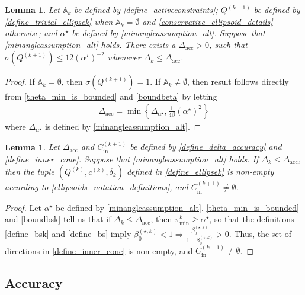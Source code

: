 \documentclass{article}
\newtheorem{lemma}[theorem]{Lemma}
\theoremstyle{case}
\numberwithin{theorem}{subsection}
\newcommand{\activeconstraintsk}{{\mathbb A_{k}}}
\newcommand{\bsk}{{\beta_0^{(\star, k)}}}
\newcommand{\ck}{{c^{(k)}}}
\newcommand{\dacc}{{\Delta_{\textrm{acc}}}}
\newcommand{\dk}{\Delta_k}
\newcommand{\fcki}{{C^{(k+1)}_{\textrm{in}}}}
\newcommand{\minanglealpha}{{ \alpha^{\star} }}
\newcommand{\minangledelta}{{\Delta_{\alpha^{\star}}}}
\newcommand{\qk}{{Q^{(k)}}}
\newcommand{\sdk}{{\delta_k}}
\newcommand{\sk}{{{s}^{(k)}}}
\newcommand{\thetamink}{{\pi^k_{\textrm{min}}}}
\newcommand{\qkpo}{{Q^{(k+1)}}}
\begin{document}
\begin{lemma}
\label{bounded_condition_numbers}
Let $\activeconstraintsk$ be defined by \cref{define_activeconstraints};
$\qkpo$ be defined by \cref{define_trivial_ellipsek} when $\activeconstraintsk = \emptyset$ and \cref{conservative_ellipsoid_details} otherwise;
and $\minanglealpha$ be defined by \cref{minangleassumption_alt}.
Suppose that \cref{minangleassumption_alt} holds.
There exists a $\dacc > 0$, such that $\sigma(\qkpo) \le {12}\left(\minanglealpha\right)^{-2}$ whenever $\dk \le \dacc$.
\end{lemma}
\begin{proof}
If $\activeconstraintsk = \emptyset$, then 
$\sigma\left(\qkpo\right) = 1$.
If $\activeconstraintsk \ne \emptyset$, then result follows directly from \cref{theta_min_is_bounded} and \cref{boundbeta} by letting
\begin{align}
\dacc = \min\left\{\minangledelta, \frac 1 {4 \beta} \left(\minanglealpha \right)^2 \right\} \label{define_delta_accuracy}
\end{align}
where $\minangledelta$ is defined by \cref{minangleassumption_alt}.
\end{proof}


\begin{lemma}
\label{sampletrk_is_nonempty}
Let $\dacc$ and $\fcki$ be defined by \cref{define_delta_accuracy} and \cref{define_inner_cone}.
Suppose that \cref{minangleassumption_alt} holds.
If $\dk \le \dacc$, then the tuple $(\qk, \ck, \sdk)$ defined in \cref{define_ellipsek}
is non-empty according to \cref{ellipsoids_notation_definitions}, and $\fcki \ne \emptyset$.
\end{lemma}
\begin{proof}
Let $\minanglealpha$ be defined by \cref{minangleassumption_alt}.
\cref{theta_min_is_bounded} and \cref{boundbsk} tell us that 
if $\dk \le \dacc$, then $\thetamink \ge \minanglealpha$, 
so that the definitions \cref{define_bsk} and \cref{define_bs} imply
$\bsk < 1 \Longrightarrow \frac{\bsk}{1 - \bsk} > 0$.
Thus, the set of directions in \cref{define_inner_cone} is non empty, and
$\fcki \ne \emptyset$.
\end{proof}


\subsection{Accuracy}
\label{ellipsoidal_lambda}
\end{document}
